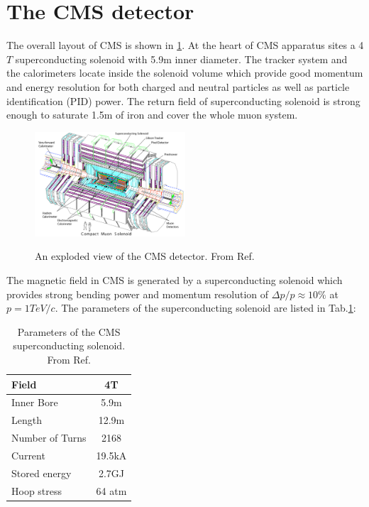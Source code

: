 \section{The CMS detector}
The overall layout of CMS is shown in \ref{fig:CMSdetector}.
At the heart of CMS apparatus sites a 4$T$ superconducting solenoid with 5.9m inner diameter. The tracker system and the calorimeters locate inside the solenoid volume which provide good momentum and energy resolution for both charged and neutral particles as well as particle identification (PID) power. The return field of superconducting solenoid is strong enough to saturate 1.5m of iron and cover the whole muon system.

\begin{figure}
    \centering
    \caption{An exploded view of the CMS detector. From Ref. \cite{cmstdr}}
    \includegraphics[width=0.5\textwidth]{fig/CMSdetector.png}
    \label{fig:CMSdetector}
\end{figure}

The magnetic field in CMS is generated by a superconducting solenoid which provides strong bending power and momentum resolution of $\Delta p/p \approx 10\% $ at $p=1TeV/c$. The parameters of the superconducting solenoid are listed in Tab.\ref{tab:magnet_parameters}:

\begin{table}[!h]
    \centering
    \caption{Parameters of the CMS superconducting solenoid. From Ref.\cite{cmstdr}}
    \begin{tabular}{|l|c|}
    \hline
    Field          &   4T      \\
    \hline
    Inner Bore     &   5.9m    \\
    \hline
    Length         &   12.9m   \\
    \hline
    Number of Turns & 2168     \\
    \hline
    Current         & 19.5kA   \\
    \hline
    Stored energy   & 2.7GJ    \\
    \hline
    Hoop stress     & 64 atm     \\
    \hline
    \end{tabular}
    \label{tab:magnet_parameters}
\end{table}


